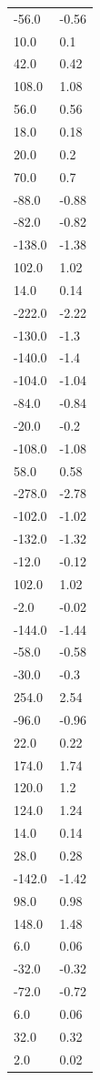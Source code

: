 \begin{longtable}{ll}
-56.0 & -0.56 \\
10.0 & 0.1 \\
42.0 & 0.42 \\
108.0 & 1.08 \\
56.0 & 0.56 \\
18.0 & 0.18 \\
20.0 & 0.2 \\
70.0 & 0.7 \\
-88.0 & -0.88 \\
-82.0 & -0.82 \\
-138.0 & -1.38 \\
102.0 & 1.02 \\
14.0 & 0.14 \\
-222.0 & -2.22 \\
-130.0 & -1.3 \\
-140.0 & -1.4 \\
-104.0 & -1.04 \\
-84.0 & -0.84 \\
-20.0 & -0.2 \\
-108.0 & -1.08 \\
58.0 & 0.58 \\
-278.0 & -2.78 \\
-102.0 & -1.02 \\
-132.0 & -1.32 \\
-12.0 & -0.12 \\
102.0 & 1.02 \\
-2.0 & -0.02 \\
-144.0 & -1.44 \\
-58.0 & -0.58 \\
-30.0 & -0.3 \\
254.0 & 2.54 \\
-96.0 & -0.96 \\
22.0 & 0.22 \\
174.0 & 1.74 \\
120.0 & 1.2 \\
124.0 & 1.24 \\
14.0 & 0.14 \\
28.0 & 0.28 \\
-142.0 & -1.42 \\
98.0 & 0.98 \\
148.0 & 1.48 \\
6.0 & 0.06 \\
-32.0 & -0.32 \\
-72.0 & -0.72 \\
6.0 & 0.06 \\
32.0 & 0.32 \\
2.0 & 0.02 \\

\end{longtable}
